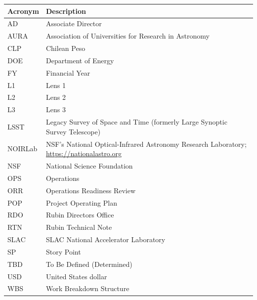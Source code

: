 \addtocounter{table}{-1}
\begin{longtable}{p{}p{}}\hline
\textbf{Acronym} & \textbf{Description}  \\\hline

AD & Associate Director \\\hline
AURA & Association of Universities for Research in Astronomy \\\hline
CLP & Chilean Peso \\\hline
DOE & Department of Energy \\\hline
FY & Financial Year \\\hline
L1 & Lens 1 \\\hline
L2 & Lens 2 \\\hline
L3 & Lens 3 \\\hline
LSST & Legacy Survey of Space and Time (formerly Large Synoptic Survey Telescope) \\\hline
NOIRLab & NSF's National Optical-Infrared Astronomy Research Laboratory; \url{https://nationalastro.org} \\\hline
NSF & National Science Foundation \\\hline
OPS & Operations \\\hline
ORR & Operations Readiness Review \\\hline
POP & Project Operating Plan \\\hline
RDO & Rubin Directors Office \\\hline
RTN & Rubin Technical Note \\\hline
SLAC & SLAC National Accelerator Laboratory \\\hline
SP & Story Point \\\hline
TBD & To Be Defined (Determined) \\\hline
USD & United States dollar \\\hline
WBS & Work Breakdown Structure \\\hline
\end{longtable}

